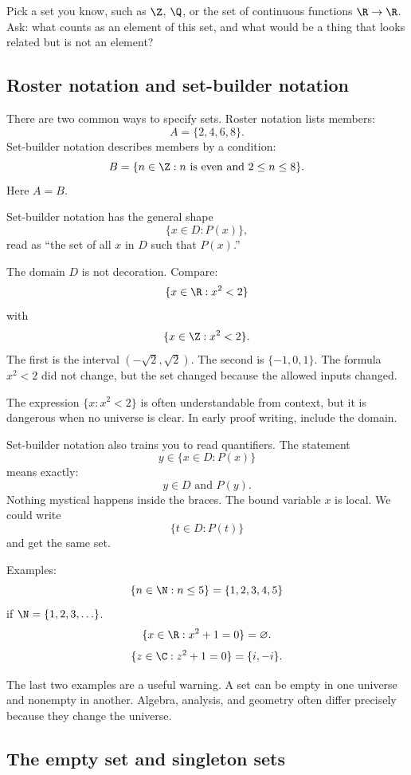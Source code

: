 \begin{walkbox}
Pick a set you know, such as $\Z$, $\Q$, or the set of continuous functions $\R\to\R$. Ask: what counts as an element of this set, and what would be a thing that looks related but is not an element?
\end{walkbox}

\subsection{Roster notation and set-builder notation}

There are two common ways to specify sets. Roster notation lists members:
\[
A=\{2,4,6,8\}.
\]
Set-builder notation describes members by a condition:
\[
B=\{n\in\Z: n \text{ is even and }2\leq n\leq 8\}.
\]
Here $A=B$.

Set-builder notation has the general shape
\[
\{x\in D:P(x)\},
\]
read as ``the set of all $x$ in $D$ such that $P(x)$.''

The domain $D$ is not decoration. Compare:
\[
\{x\in\R:x^2<2\}
\]
with
\[
\{x\in\Z:x^2<2\}.
\]
The first is the interval $(-\sqrt2,\sqrt2)$. The second is $\{-1,0,1\}$. The formula $x^2<2$ did not change, but the set changed because the allowed inputs changed.

\begin{trapbox}
The expression $\{x:x^2<2\}$ is often understandable from context, but it is dangerous when no universe is clear. In early proof writing, include the domain.
\end{trapbox}

Set-builder notation also trains you to read quantifiers. The statement
\[
y\in\{x\in D:P(x)\}
\]
means exactly:
\[
y\in D\text{ and }P(y).
\]
Nothing mystical happens inside the braces. The bound variable $x$ is local. We could write
\[
\{t\in D:P(t)\}
\]
and get the same set.

Examples:
\[
\{n\in\N:n\leq 5\}=\{1,2,3,4,5\}
\]
if $\N=\{1,2,3,\ldots\}$.
\[
\{x\in\R:x^2+1=0\}=\varnothing.
\]
\[
\{z\in\C:z^2+1=0\}=\{i,-i\}.
\]

The last two examples are a useful warning. A set can be empty in one universe and nonempty in another. Algebra, analysis, and geometry often differ precisely because they change the universe.

\subsection{The empty set and singleton sets}

